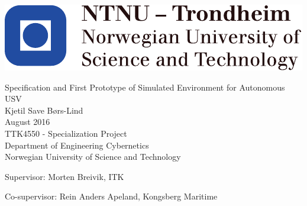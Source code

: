 
\thispagestyle{empty}
\includegraphics[scale=1.1]{fig/NTNU}
\mbox{}\\[6pc]
\begin{center}
\Huge{Specification and First Prototype of Simulated Environment for Autonomous USV}\\[2pc]

\Large{Kjetil Save Børs-Lind}\\[1pc]
\large{August 2016}\\[2pc]

TTK4550 - Specialization Project\\
Department of Engineering Cybernetics\\
Norwegian University of Science and Technology
\end{center}
\vfill

\noindent Supervisor: Morten Breivik, ITK

\noindent Co-supervisor: Rein Anders Apeland, Kongsberg Maritime



